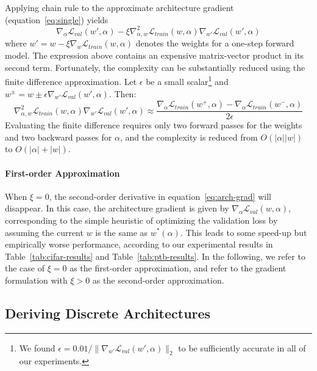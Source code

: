 \documentclass{article}
\def\eqref#1{equation~\ref{#1}}
\begin{document}
Applying chain rule to the approximate architecture gradient (\eqref{eq:single}) yields
\begin{equation}
	\nabla_\alpha \mathcal{L}_{val}(w', \alpha) - \xi \nabla^2_{\alpha, w} \mathcal{L}_{train}(w, \alpha) \nabla_{w'} \mathcal{L}_{val}(w', \alpha) 
        \label{eq:arch-grad}
\end{equation}
where $w' = w - \xi \nabla_w \mathcal{L}_{train}(w, \alpha)$ denotes the weights for a one-step forward model.
The expression above contains an expensive matrix-vector product 
in its second term.
Fortunately,
the complexity can be substantially reduced using the finite difference approximation.
Let $\epsilon$ be a small scalar\footnote{We found $\epsilon = 0.01/\|\nabla_{w'} \mathcal{L}_{val}(w', \alpha)\|_2$ to be sufficiently accurate in all of our experiments.} and
$w^\pm = w \pm \epsilon \nabla_{w'} \mathcal{L}_{val}(w', \alpha)$. Then:
\begin{equation}
	\nabla^2_{\alpha, w} \mathcal{L}_{train}(w, \alpha) \nabla_{w'} \mathcal{L}_{val}(w', \alpha) 
	\approx
	\frac{\nabla_\alpha \mathcal{L}_{train}(w^+, \alpha) - \nabla_\alpha \mathcal{L}_{train}(w^-, \alpha)}{2 \epsilon}
\end{equation}
Evaluating the finite difference requires only two forward passes for the weights and two backward passes for $\alpha$,
and the complexity is reduced from $O(|\alpha||w|)$ to $O(|\alpha|+|w|)$.

\paragraph{First-order Approximation}
When $\xi = 0$,
the second-order derivative in \eqref{eq:arch-grad}
will disappear.
In this case,
the architecture gradient is given by $\nabla_\alpha \mathcal{L}_{val}(w, \alpha)$, corresponding to the simple heuristic of optimizing the validation loss by assuming the current $w$ is the same as $w^*(\alpha)$.
This leads to some speed-up but empirically worse performance, according to our experimental results in Table~\ref{tab:cifar-results} and Table~\ref{tab:ptb-results}.
In the following,
we refer to the case of $\xi = 0$ as the first-order approximation,
and refer to the gradient formulation with $\xi > 0$ as the second-order approximation.


\subsection{Deriving Discrete Architectures}
\end{document}
